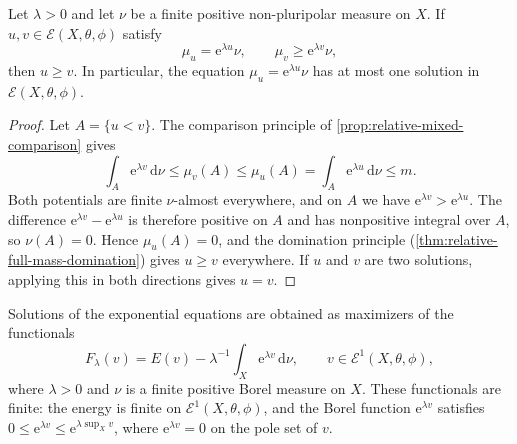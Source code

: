 \begin{proposition}\label{prop:relative-exponential-equation-domination}
Let $\lambda>0$ and let $\nu$ be a finite positive non-pluripolar measure on $X$. If $u,v\in\mathcal E(X,\theta,\phi)$ satisfy
\[
 \mu_u=\mathrm e^{\lambda u}\nu,
       \qquad \mu_v\geq\mathrm e^{\lambda v}\nu,
\]
then $u\geq v$. In particular, the equation $\mu_u=\mathrm e^{\lambda u}\nu$ has at most one solution in $\mathcal E(X,\theta,\phi)$.
\end{proposition}
\begin{proof}
Let $A=\{u<v\}$. The comparison principle of \cref{prop:relative-mixed-comparison} gives
\[
 \int_A\mathrm e^{\lambda v}\,\mathrm d\nu
   \leq\mu_v(A)\leq\mu_u(A)
   =\int_A\mathrm e^{\lambda u}\,\mathrm d\nu\leq m.
\]
Both potentials are finite $\nu$-almost everywhere, and on $A$ we have $\mathrm e^{\lambda v}>\mathrm e^{\lambda u}$. The difference $\mathrm e^{\lambda v}-\mathrm e^{\lambda u}$ is therefore positive on $A$ and has nonpositive integral over $A$, so $\nu(A)=0$. Hence $\mu_u(A)=0$, and the domination principle (\cref{thm:relative-full-mass-domination}) gives $u\geq v$ everywhere. If $u$ and $v$ are two solutions, applying this in both directions gives $u=v$.
\end{proof}

Solutions of the exponential equations are obtained as maximizers of the functionals
\begin{equation}\label{eq:relative-exponential-functional}
 F_\lambda(v)=E(v)-\lambda^{-1}\int_X\mathrm e^{\lambda v}\,\mathrm d\nu,\qquad v\in\mathcal E^1(X,\theta,\phi),
\end{equation}
where $\lambda>0$ and $\nu$ is a finite positive Borel measure on $X$. These functionals are finite: the energy is finite on $\mathcal E^1(X,\theta,\phi)$, and the Borel function $\mathrm e^{\lambda v}$ satisfies $0\leq\mathrm e^{\lambda v}\leq\mathrm e^{\lambda\sup_Xv}$, where $\mathrm e^{\lambda v}=0$ on the pole set of $v$.

